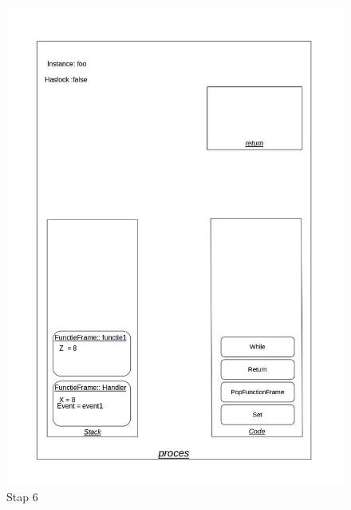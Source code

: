 \documentclass[]{article}
\begin{document}
\begin{figure}[H]
\centering
\includegraphics[scale=0.4]{AnalyseADTAlgorithm/processtappen/stap6.jpg}
\caption{Stap 6}
\end{figure}
\end{document}
